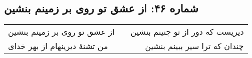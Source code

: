 \begin{center}
\section*{شماره ۴۶: از عشق تو روی بر زمینم بنشین}
\label{sec:046}
\begin{longtable}{l p{0.5cm} r}
از عشق تو روی بر زمینم بنشین
&&
دیریست که دور از تو چنینم بنشین
\\
من تشنهٔ دیرینهام از بهر خدای
&&
چندان که ترا سیر ببینم بنشین
\\
\end{longtable}
\end{center}
